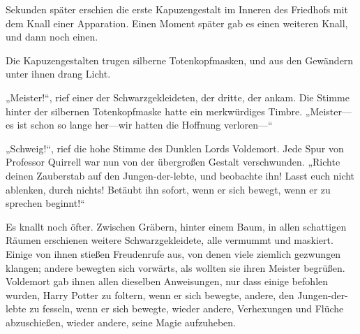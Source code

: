 Sekunden später erschien die erste Kapuzengestalt im Inneren des Friedhofs mit dem Knall einer Apparation. Einen Moment später gab es einen weiteren Knall, und dann noch einen.

Die Kapuzengestalten trugen silberne Totenkopfmasken, und aus den Gewändern unter ihnen drang Licht.

„Meister!“, rief einer der Schwarzgekleideten, der dritte, der ankam. Die Stimme hinter der silbernen Totenkopfmaske hatte ein merkwürdiges Timbre.
„Meister—es ist schon so lange her—wir hatten die Hoffnung verloren—“

„Schweig!“, rief die hohe Stimme des Dunklen Lords Voldemort.
Jede Spur von Professor Quirrell war nun von der übergroßen Gestalt verschwunden.
„Richte deinen Zauberstab auf den Jungen-der-lebte, und beobachte ihn! Lasst euch nicht ablenken, durch nichts! Betäubt ihn sofort, wenn er sich bewegt, wenn er zu sprechen beginnt!“

Es knallt noch öfter.
Zwischen Gräbern, hinter einem Baum, in allen schattigen Räumen erschienen weitere Schwarzgekleidete, alle vermummt und maskiert. Einige von ihnen stießen Freudenrufe aus, von denen viele ziemlich gezwungen klangen; andere bewegten sich vorwärts, als wollten sie ihren Meister begrüßen. Voldemort gab ihnen allen dieselben Anweisungen, nur dass einige befohlen wurden, Harry Potter zu foltern, wenn er sich bewegte, andere, den Jungen-der-lebte zu fesseln, wenn er sich bewegte, wieder andere, Verhexungen und Flüche abzuschießen, wieder andere, seine Magie aufzuheben.

